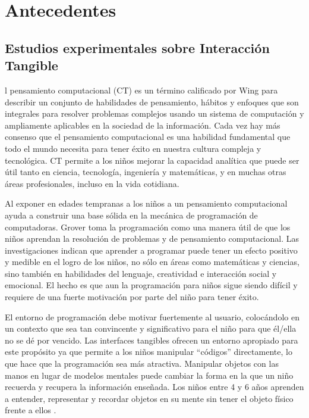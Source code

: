 \chapter{Antecedentes}
\label{chap:antecedentes}
\section{Estudios experimentales sobre Interacción Tangible}


l pensamiento computacional (CT) es un término calificado por Wing \cite{Wing} para describir un conjunto de habilidades de pensamiento, hábitos y enfoques que son integrales para resolver problemas complejos usando un sistema de computación y ampliamente aplicables en la sociedad de la información. Cada vez hay más consenso que el pensamiento computacional es una habilidad fundamental que todo el mundo necesita para tener éxito en nuestra cultura compleja y tecnológica. CT permite a los niños mejorar la capacidad analítica que puede ser útil tanto en ciencia, tecnología, ingeniería y matemáticas, y en muchas otras áreas profesionales, incluso en la vida cotidiana. 

Al exponer en edades tempranas a los niños a un pensamiento computacional ayuda a construir una base sólida en la mecánica de programación de computadoras. Grover \cite{Grover} toma la programación como una manera útil de que los niños aprendan la resolución de problemas y de pensamiento computacional. Las investigaciones indican que aprender a programar puede tener un efecto positivo y medible en el logro de los niños, no sólo en áreas como matemáticas y ciencias, sino también en habilidades del lenguaje, creatividad e interacción social y emocional. El hecho es que aun la programación para niños sigue siendo difícil y requiere de una fuerte motivación por parte del niño para tener éxito.

El entorno de programación debe motivar fuertemente al usuario, colocándolo en un contexto que sea tan convincente y significativo para el niño para que él/ella no se dé por vencido. Las interfaces tangibles ofrecen un entorno apropiado para este propósito ya que permite a los niños manipular “códigos” directamente, lo que hace que la programación sea más atractiva. Manipular objetos con las manos en lugar de modelos mentales puede cambiar la forma en la que un niño recuerda y recupera la información enseñada. Los niños entre 4 y 6 años aprenden a entender, representar y recordar objetos en su mente sin tener el objeto físico frente a ellos \cite{Piaget}.

